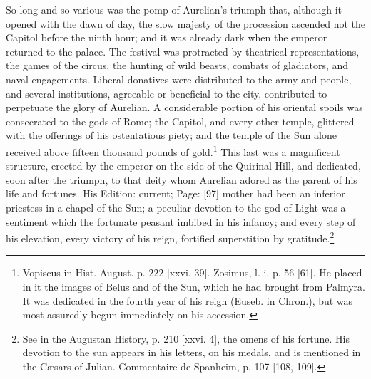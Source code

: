 So long and so various was the pomp of Aurelian\texthebrew{}’s triumph that, although it opened with the dawn of day, the slow majesty of the procession ascended not the Capitol before the ninth hour; and it was already dark when the emperor returned to the palace. The festival was protracted by theatrical representations, the games of the circus, the hunting of wild beasts, combats of gladiators, and naval engagements. Liberal donatives were distributed to the army and people, and several institutions, agreeable or beneficial to the city, contributed to perpetuate the glory of Aurelian. A considerable portion of his oriental spoils was consecrated to the gods of Rome; the Capitol, and every other temple, glittered with the offerings of his ostentatious piety; and the temple of the Sun alone received above fifteen thousand pounds of gold.\footnote{Vopiscus in Hist. August. p. 222 [xxvi. 39]. Zosimus, l. i. p. 56 [61]. He placed in it the images of Belus and of the Sun, which he had brought from Palmyra. It was dedicated in the fourth year of his reign (Euseb. in Chron.), but was most assuredly begun immediately on his accession.} This last was a magnificent structure, erected by the emperor on the side of the Quirinal Hill, and dedicated, soon after the triumph, to that deity whom Aurelian adored as the parent of his life and fortunes. His Edition: current; Page: [97] mother had been an inferior priestess in a chapel of the Sun; a peculiar devotion to the god of Light was a sentiment which the fortunate peasant imbibed in his infancy; and every step of his elevation, every victory of his reign, fortified superstition by gratitude.\footnote{See in the Augustan History, p. 210 [xxvi. 4], the omens of his fortune. His devotion to the sun appears in his letters, on his medals, and is mentioned in the Cæsars of Julian. Commentaire de Spanheim, p. 107 [108, 109].}

